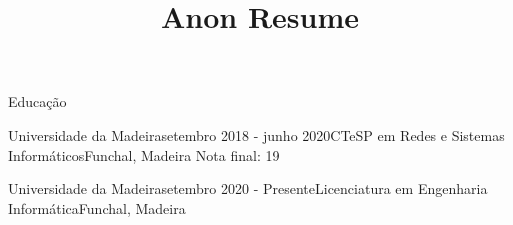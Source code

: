 \documentclass{resume} %
\begin{document}
\title{Anon Resume}

\begin{rSection}{Educação}

\begin{rSubsection}{Universidade da Madeira}{setembro 2018 - junho 2020}{CTeSP em Redes e Sistemas Informáticos}{Funchal, Madeira}
Nota final: 19
\vspace{-.65cm}
\item[]
\end{rSubsection}

\begin{rSubsection}{Universidade da Madeira}{setembro 2020 - Presente}{Licenciatura em Engenharia Informática}{Funchal, Madeira}
    \vspace{-.65cm}
    \item[]
    \end{rSubsection}
\end{rSection}

\end{document}

